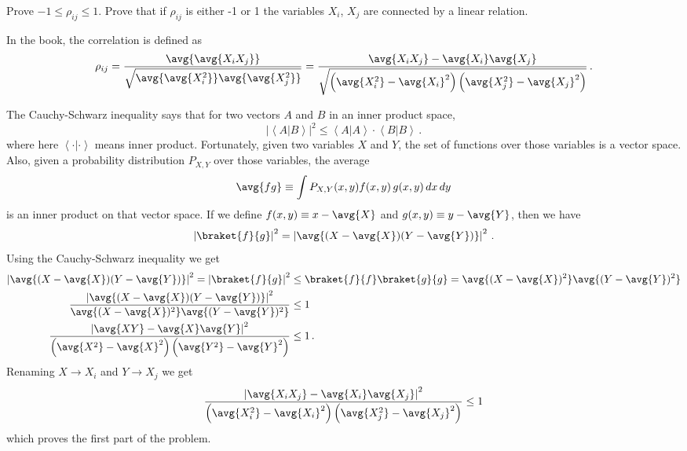 

Prove $-1 \leq \rho_{ij} \leq 1$.
Prove that if $\rho_{ij}$ is either -1 or 1 the variables $X_i$, $X_j$ are connected by a linear relation.

In the book, the correlation is defined as
\begin{equation*}
  \rho_{ij}
  = \frac{\avg{\avg{X_i X_j}}}{\sqrt{\avg{\avg{X_i^2}} \avg{\avg{X_j^2}}}}
  = \frac{\avg{X_i X_j}
  - \avg{X_i}\avg{X_j}}{
  \sqrt{\left(\avg{X_i^2} - \avg{X_i}^2 \right) \left( \avg{X_j^2} - \avg{X_j}^2 \right)}
  }
  \, .
\end{equation*}


The Cauchy-Schwarz inequality says that for two vectors $A$ and $B$ in an inner product space,
\begin{equation*}
  \left\lvert \left \langle A | B \right \rangle \right\vert ^2
  \leq \left\langle A | A \right\rangle \cdot \left\langle B | B \right\rangle
  \, .
\end{equation*}
where here $\left \langle \cdot | \cdot \right \rangle$ means inner product.
Fortunately, given two variables $X$ and $Y$, the set of functions over those variables is a vector space.
Also, given a probability distribution $P_{X,Y}$ over those variables, the average
\begin{equation*}
  \avg{f g} \equiv \int P_{X,Y}(x, y) f(x, y) \, g(x, y) \, dx \, dy
\end{equation*}
is an inner product on that vector space.
If we define $f(x,y) \equiv x - \avg{X}$ and $g(x,y) \equiv y - \avg{Y}$, then we have
\begin{align*}
  \left \lvert \braket{f}{g} \right \rvert^2
  = \left \lvert \avg{(X - \avg{X})(Y - \avg{Y})} \right \rvert^2
  \, .
\end{align*}
Using the Cauchy-Schwarz inequality we get
\begin{align*}
  \left \lvert \avg{(X - \avg{X})(Y - \avg{Y})} \right \rvert^2
  = \left \lvert \braket{f}{g} \right \rvert^2
  &\leq \braket{f}{f} \braket{g}{g}
  = \avg{(X - \avg{X})^2} \avg{(Y - \avg{Y})^2} \\
  \frac{\left \lvert \avg{(X - \avg{X})(Y - \avg{Y})} \right \rvert^2}
  {\avg{(X - \avg{X})^2} \avg{(Y - \avg{Y})^2}}
  &\leq 1 \\
  \frac{
  \left \lvert \avg{XY} - \avg{X}\avg{Y} \right \rvert^2}
  {\left(\avg{X^2} - \avg{X}^2 \right) \left( \avg{Y^2} - \avg{Y}^2 \right)}
  &\leq 1
  \, .
\end{align*}
Renaming $X \rightarrow X_i$ and $Y \rightarrow X_j$ we get\
\begin{equation*}
  \frac{\left \lvert \avg{X_i X_j} - \avg{X_i}\avg{X_j} \right \rvert^2}
  {\left(\avg{X_i^2} - \avg{X_i}^2 \right) \left( \avg{X_j^2} - \avg{X_j}^2 \right)}
  \leq 1
\end{equation*}
which proves the first part of the problem.


